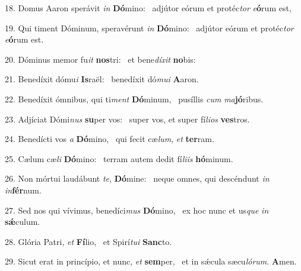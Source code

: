 18. Domus Aaron sperávit \textit{in} \textbf{Dó}mino: \ast\  adjútor eórum et protéc\textit{tor} \textit{e}\textbf{ó}rum est,\

19. Qui timent Dóminum, speravérunt \textit{in} \textbf{Dó}mino: \ast\  adjútor eórum et protéc\textit{tor} \textit{e}\textbf{ó}rum est.\

20. Dóminus memor fu\textit{it} \textbf{nos}tri: \ast\  et bene\textit{dí}\textit{xit} \textbf{no}bis:\

21. Benedíxit dómu\textit{i} \textbf{Is}raël: \ast\  benedíxit dó\textit{mu}\textit{i} \textbf{A}aron.\

22. Benedíxit ómnibus, qui ti\textit{ment} \textbf{Dó}minum, \ast\  pusíllis \textit{cum} \textit{ma}\textbf{jó}ribus.\

23. Adjíciat Dómi\textit{nus} \textbf{su}per vos: \ast\  super vos, et super fí\textit{li}\textit{os} \textbf{ves}tros.\

24. Benedícti vos \textit{a} \textbf{Dó}mino, \ast\  qui fecit cæ\textit{lum}, \textit{et} \textbf{ter}ram.\

25. Cælum cæ\textit{li} \textbf{Dó}mino: \ast\  terram autem dedit fí\textit{li}\textit{is} \textbf{hó}minum.\

26. Non mórtui laudábunt \textit{te}, \textbf{Dó}mine: \ast\  neque omnes, qui descéndunt \textit{in} \textit{in}\textbf{fér}num.\

27. Sed nos qui vívimus, benedíci\textit{mus} \textbf{Dó}mino, \ast\  ex hoc nunc et us\textit{que} \textit{in} \textbf{sǽ}culum.\

28. Glória Patri, \textit{et} \textbf{Fí}lio, \ast\  et Spirí\textit{tu}\textit{i} \textbf{Sanc}to.\

29. Sicut erat in princípio, et nunc, \textit{et} \textbf{sem}per, \ast\  et in sǽcula sæcu\textit{ló}\textit{rum}. \textbf{A}men.\


